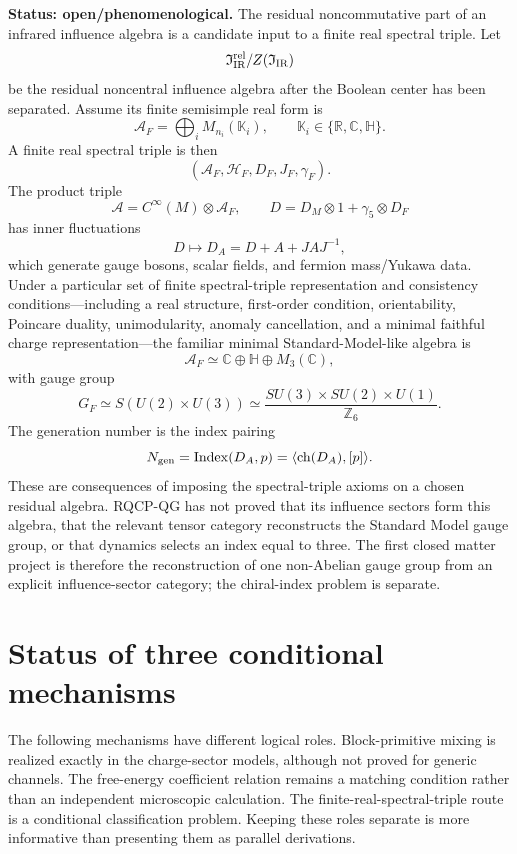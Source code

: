 \documentclass[11pt]{article}
\newcommand{\StatusOpen}{\textcolor{statusred}{\textsf{open/phenomenological}}}
\newcommand{\A}{\mathcal A}
\newcommand{\Hh}{\mathcal H}
\newcommand{\I}{\mathfrak I}
\newcommand{\Index}{\operatorname{Index}}
\begin{document}
\textbf{Status: \StatusOpen.}
The residual noncommutative part of an infrared influence algebra is a
candidate input to a finite real spectral triple.  Let
\[
\I_{\rm IR}^{\rm rel}/Z(\I_{\rm IR})
\]
be the residual noncentral influence algebra after the Boolean center has been separated.  Assume its finite semisimple real form is
\[
\A_F=\bigoplus_iM_{n_i}(\mathbb K_i),
\qquad
\mathbb K_i\in\{\mathbb R,\mathbb C,\mathbb H\}.
\]
A finite real spectral triple is then
\[
(\A_F,\Hh_F,D_F,J_F,\gamma_F).
\]
The product triple
\[
\A=C^\infty(M)\otimes\A_F,
\qquad
D=D_M\otimes1+\gamma_5\otimes D_F
\]
has inner fluctuations
\[
D\mapsto D_A=D+A+JAJ^{-1},
\]
which generate gauge bosons, scalar fields, and fermion mass/Yukawa data.
Under a particular set of finite spectral-triple representation and
consistency conditions---including a real structure, first-order condition,
orientability, Poincare duality, unimodularity, anomaly cancellation, and a
minimal faithful charge representation---the familiar minimal
Standard-Model-like algebra is \cite{ConnesMarcolli,ChamseddineConnes}
\[
\A_F\simeq \mathbb C\oplus\mathbb H\oplus M_3(\mathbb C),
\]
with gauge group
\[
G_F\simeq S(U(2)\times U(3))
\simeq \frac{SU(3)\times SU(2)\times U(1)}{\mathbb Z_6}.
\]
The generation number is the index pairing
\[
N_{\rm gen}=\Index(D_A,p)=\langle \operatorname{ch}(D_A),[p]\rangle.
\]
These are consequences of imposing the spectral-triple axioms on a chosen
residual algebra.  RQCP-QG has not proved that its influence sectors form this
algebra, that the relevant tensor category reconstructs the Standard Model
gauge group, or that dynamics selects an index equal to three.  The first
closed matter project is therefore the reconstruction of one non-Abelian
gauge group from an explicit influence-sector category; the chiral-index
problem is separate.




\section{Status of three conditional mechanisms}\label{sec:v62-referee-hardening}

The following mechanisms have different logical roles.  Block-primitive
mixing is realized exactly in the charge-sector models, although not proved
for generic channels.  The
free-energy coefficient relation remains a matching condition rather than an
independent microscopic calculation.  The finite-real-spectral-triple route
is a conditional classification problem.  Keeping these roles separate is
more informative than presenting them as parallel derivations.
\end{document}
